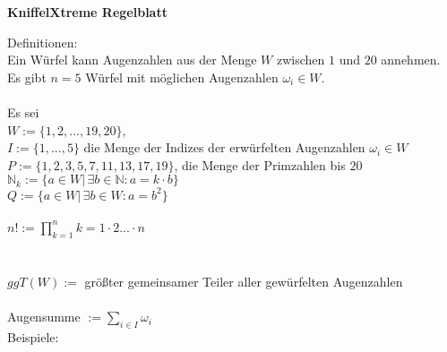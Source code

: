 \documentclass[a4paper,11pt]{exam}
\newcommand{\N} {\mathbb{N}}
\begin{document}
\begin{center}
    \Large\bf{KniffelXtreme Regelblatt}
\end{center}

\noindent Definitionen: %
\vspace{0.5cm}
\\
Ein Würfel kann Augenzahlen aus der Menge $W$ zwischen $1$ und $20$ annehmen. \\
Es gibt $n = 5$ Würfel mit möglichen Augenzahlen $\omega_i \in W$.\\
\\
Es sei\\
$W := \{1, 2, ..., 19, 20 \}$, \\
$I :=\{1,...,5\}$  die Menge der Indizes der erwürfelten Augenzahlen $\omega_i \in W$\\
$P := %
 \{ 1,2,3,5,7,11,13,17,19\}$, die Menge der Primzahlen bis $20$
\\
$\N_k := \{ a \in W|\hspace{2pt} \exists b \in \N: a = k\cdot b \}$ \\
$Q := \{ a \in W | \hspace{2pt}\exists b \in W: a = b^2 \} $\\
\\
$n! := \displaystyle\prod_{k=1}^{n}k = 1 \cdot 2 ... \cdot n$\\
\\\\
$ggT(W) := $ größter gemeinsamer Teiler aller gewürfelten Augenzahlen\\
\\
Augensumme $:= \displaystyle\sum_{i\in I}\omega_i$
\newline\newline\newline
\vspace{0.5cm}\\
\noindent Beispiele: %
\vspace{0.5cm}
\end{document}
